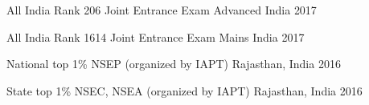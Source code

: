 \begin{cvhonors}

  \cvhonor
  {All India Rank 206}
  {Joint Entrance Exam Advanced}
  {India}
  {2017}

  \cvhonor
  {All India Rank 1614}
  {Joint Entrance Exam Mains}
  {India}
  {2017}


  \cvhonor
  {National top 1\%}
  {NSEP (organized by IAPT)}
  {Rajasthan, India}
  {2016}
  
  \cvhonor
  {State top 1\%}
  {NSEC, NSEA (organized by IAPT)}
  {Rajasthan, India}
  {2016}


\end{cvhonors}

